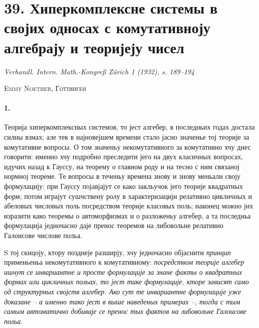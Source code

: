 ﻿\documentclass[11pt]{article}
\newcommand{\foreign}[1]{#1}
\begin{document}
\section*{39. Хиперкомплексне системы в својих односах с комутативноју алгебрају и теоријеју чисел}

\begin{center}
\foreign{\emph{Verhandl. Intern. Math.-Kongreß Zürich 1 (1932), s. 189--194}}
\end{center}

\begin{center}
\textsc{Emmy Noether, Готтинген}
\end{center}

\paragraph{1.}
Теорија хиперкомплексных системов, то јест алгебер, в последньих годах достала силны взмах; але тек в најновејшем времени стало јасно значенье тој теорије за комутативне вопросы. О том значеньу некомутативного за комутативно хчу днес говорити: именно хчу подробно преследити јего на двух класичных вопросах, идучих назад к Гауссу, на теорему о главном роду и на тесно с ним связаној нормној теореме. Те вопросы в теченьу времена знову и знову меньали своју формулацију: при Гауссу појавјајут се како закльучок јего теорије квадратных форм; потом играјут сушчствену ролу в характеризацији релативно цикличных и абеловых числовых поль посредством теорије класовых поль; наконец можно јих изразити како теоремы о автоморфизмах и о разложеньу алгебер, а та последньа формулација једночасно даје пренос теоремов на либовольне релативно Галоисове числове польа.

S тој скицоју, ктору позднеје разширју, хчу једночасно објаснити \emph{принцип} применьеньа некомутативного к комутативному: \emph{посредством теорије алгебер ишчут се инвариантне и просте формулације за знане факты о квадратных формах или цикличных польах, то јест таке формулације, кторе зависят само од структурных својств алгебер. Ако сут те инвариантне формулације уже доказане -- а именно тако јест в выше наведеных примерах --, тогда с тым самым автоматично добиваје се пренос тых фактов на либовольне Галоисове польа.}
\end{document}
